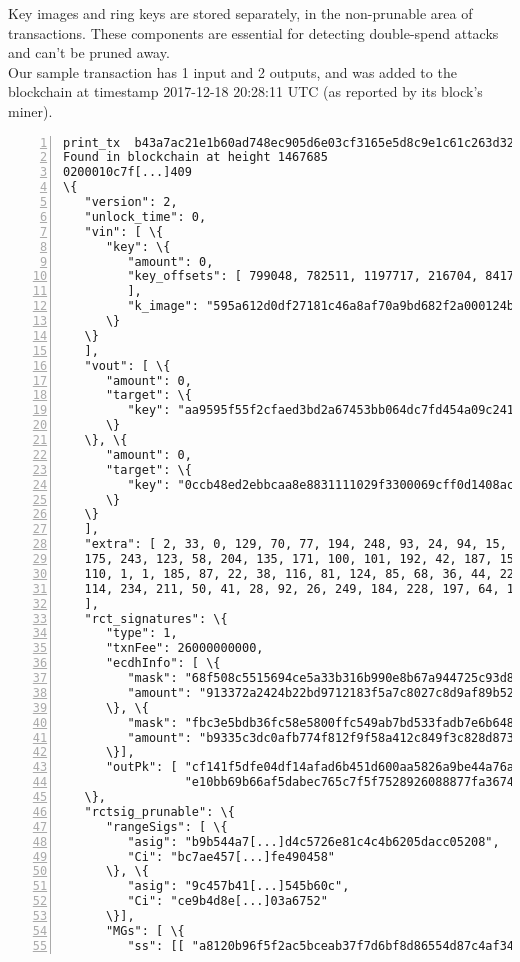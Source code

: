 \begin{appendices}
Key images and ring keys are stored separately, in the non-prunable area of transactions. These components are essential for detecting double-spend attacks and can’t be pruned away.
\\

Our sample transaction has 1 input and 2 outputs, and was added to the blockchain at timestamp 2017-12-18 20:28:11 UTC (as reported by its block's miner).


\begin{Verbatim}[commandchars=\\\{\}, numbers=left]
print_tx  b43a7ac21e1b60ad748ec905d6e03cf3165e5d8c9e1c61c263d328118c42eaa6 +hex +json
Found in blockchain at height 1467685
0200010c7f[...]409
\{
   "version": 2,
   "unlock_time": 0, 
   "vin": [ \{
      "key": \{
         "amount": 0, 
         "key_offsets": [ 799048, 782511, 1197717, 216704, 841722
         ], 
         "k_image": "595a612d0df27181c46a8af70a9bd682f2a000124b873ba5d2b9f4b4e4efd672"
      \}
   \}
   ], 
   "vout": [ \{
      "amount": 0, 
      "target": \{
         "key": "aa9595f55f2cfaed3bd2a67453bb064dc7fd454a09c2418d7338782790185fe3"
      \}
   \}, \{
      "amount": 0, 
      "target": \{
         "key": "0ccb48ed2ebbcaa8e8831111029f3300069cff0d1408acffbfc3810b362ea217"
      \}
   \}
   ], 
   "extra": [ 2, 33, 0, 129, 70, 77, 194, 248, 93, 24, 94, 15, 107, 233, 0, 229, 82, 
   175, 243, 123, 58, 204, 135, 171, 100, 101, 192, 42, 187, 157, 168, 222, 98, 192, 
   110, 1, 1, 185, 87, 22, 38, 116, 81, 124, 85, 68, 36, 44, 229, 235, 46, 159, 139, 
   114, 234, 211, 50, 41, 28, 92, 26, 249, 184, 228, 197, 64, 139, 5
   ], 
   "rct_signatures": \{
      "type": 1, 
      "txnFee": 26000000000, 
      "ecdhInfo": [ \{
         "mask": "68f508c5515694ce5a33b316b990e8b67a944725c93d806767e61b2e0b13d300", 
         "amount": "913372a2424b22bd9712183f5a7c8027c8d9af89b52d1e7d06fd1f87a1e5d20d"
      \}, \{
         "mask": "fbc3e5bdb36fc58e5800ffc549ab7bd533fadb7e6b64898c82ea620d749fc80e", 
         "amount": "b9335c3dc0afb774f812f9f58a412c849f3c828d873f1c16ab102963799d9809"
      \}], 
      "outPk": [ "cf141f5dfe04df14afad6b451d600aa5826a9be44a76a1630850c1d5951d482e",
                 "e10bb69b66af5dabec765c7f5f7528926088877fa36746833828a0575896ae57"]
   \}, 
   "rctsig_prunable": \{
      "rangeSigs": [ \{
         "asig": "b9b544a7[...]d4c5726e81c4c4b6205dacc05208", 
         "Ci": "bc7ae457[...]fe490458"
      \}, \{
         "asig": "9c457b41[...]545b60c", 
         "Ci": "ce9b4d8e[...]03a6752"
      \}], 
      "MGs": [ \{
         "ss": [[ "a8120b96f5f2ac5bceab37f7d6bf8d86554d87c4af3441007cad92f54a24d908",

\end{Verbatim}
\end{appendices}
